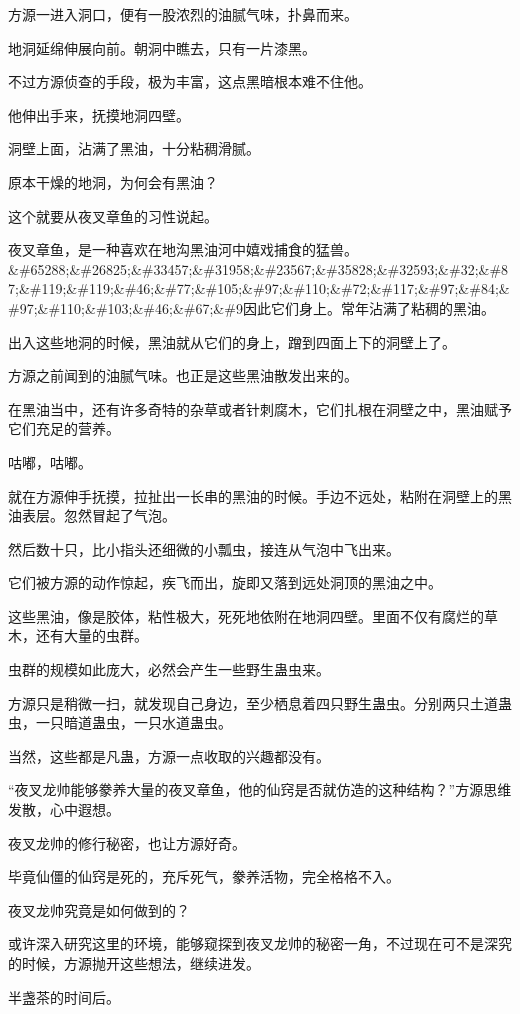 \begin{this_body}
方源一进入洞口，便有一股浓烈的油腻气味，扑鼻而来。

地洞延绵伸展向前。朝洞中瞧去，只有一片漆黑。

不过方源侦查的手段，极为丰富，这点黑暗根本难不住他。

他伸出手来，抚摸地洞四壁。

洞壁上面，沾满了黑油，十分粘稠滑腻。

原本干燥的地洞，为何会有黑油？

这个就要从夜叉章鱼的习性说起。

夜叉章鱼，是一种喜欢在地沟黑油河中嬉戏捕食的猛兽。\&\#65288;\&\#26825;\&\#33457;\&\#31958;\&\#23567;\&\#35828;\&\#32593;\&\#32;\&\#87;\&\#119;\&\#119;\&\#46;\&\#77;\&\#105;\&\#97;\&\#110;\&\#72;\&\#117;\&\#97;\&\#84;\&\#97;\&\#110;\&\#103;\&\#46;\&\#67;\&\#9因此它们身上。常年沾满了粘稠的黑油。

出入这些地洞的时候，黑油就从它们的身上，蹭到四面上下的洞壁上了。

方源之前闻到的油腻气味。也正是这些黑油散发出来的。

在黑油当中，还有许多奇特的杂草或者针刺腐木，它们扎根在洞壁之中，黑油赋予它们充足的营养。

咕嘟，咕嘟。

就在方源伸手抚摸，拉扯出一长串的黑油的时候。手边不远处，粘附在洞壁上的黑油表层。忽然冒起了气泡。

然后数十只，比小指头还细微的小瓢虫，接连从气泡中飞出来。

它们被方源的动作惊起，疾飞而出，旋即又落到远处洞顶的黑油之中。

这些黑油，像是胶体，粘性极大，死死地依附在地洞四壁。里面不仅有腐烂的草木，还有大量的虫群。

虫群的规模如此庞大，必然会产生一些野生蛊虫来。

方源只是稍微一扫，就发现自己身边，至少栖息着四只野生蛊虫。分别两只土道蛊虫，一只暗道蛊虫，一只水道蛊虫。

当然，这些都是凡蛊，方源一点收取的兴趣都没有。

“夜叉龙帅能够豢养大量的夜叉章鱼，他的仙窍是否就仿造的这种结构？”方源思维发散，心中遐想。

夜叉龙帅的修行秘密，也让方源好奇。

毕竟仙僵的仙窍是死的，充斥死气，豢养活物，完全格格不入。

夜叉龙帅究竟是如何做到的？

或许深入研究这里的环境，能够窥探到夜叉龙帅的秘密一角，不过现在可不是深究的时候，方源抛开这些想法，继续进发。

半盏茶的时间后。


\end{this_body}
